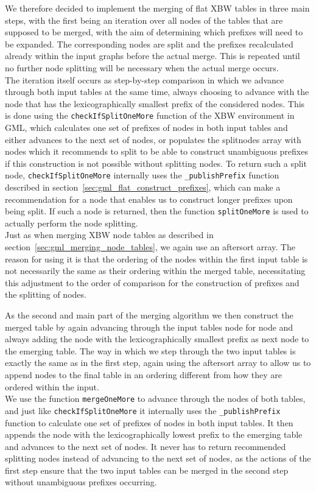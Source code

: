 \documentclass[a4paper,12pt,twoside,BCOR=10mm]{scrbook}
\begin{document}
We therefore decided to implement the merging of flat XBW tables in three main steps,
with the first being an iteration over all nodes of the tables that are supposed to be merged,
with the aim of determining which prefixes will need to be expanded. The corresponding nodes are
split and the prefixes recalculated already within the input graphs before the actual merge.
This is repeated until no further node splitting will be necessary when the actual
merge occurs. \\
The iteration itself occurs as step-by-step comparison in which we advance through
both input tables at the same time, always choosing to advance with the node that has the lexicographically
smallest prefix of the considered nodes.
This is done using the \texttt{checkIfSplitOneMore} function of the XBW environment in GML,
which calculates one set of prefixes of nodes in both input tables
and either advances to the next set of nodes, or populates the splitnodes array
with nodes which it recommends to split to be able to construct unambiguous prefixes if this
construction is not possible without splitting nodes.
To return such a split node, \texttt{checkIfSplitOneMore} internally uses the \texttt{\_publishPrefix} function
described in section~\ref{sec:gml_flat_construct_prefixes}, which can make a recommendation for a
node that enables us to construct longer prefixes upon being split.
If such a node is returned, then the function \texttt{splitOneMore} is used to actually
perform the node splitting. \\
Just as when merging XBW node tables as described in section~\ref{sec:gml_merging_node_tables},
we again use an aftersort array.
The reason for using it is that the ordering of the nodes within the first input table is not necessarily the
same as their ordering within the merged table, necessitating this adjustment to the order of comparison
for the construction of prefixes and the splitting of nodes.

As the second and main part of the merging algorithm
we then construct the merged table by again advancing through the
input tables node for node and always adding the node with the lexicographically smallest prefix
as next node to the emerging table. The way in which we step through the two input tables
is exactly the same as in the first step, again using the aftersort array to allow us to
append nodes to the final table in an ordering different from how they are
ordered within the input. \\
We use the function \texttt{mergeOneMore} to advance through the nodes of both tables,
and just like \texttt{checkIfSplitOneMore} it internally uses the \texttt{\_publishPrefix} function
to calculate one set of prefixes of nodes in both input tables.
It then appends the node with the lexicographically lowest prefix to the emerging table
and advances to the next set of nodes.
It never has to return recommended splitting nodes instead of advancing to the next
set of nodes, as the actions of the first step ensure that the two input tables
can be merged in the second step without unambiguous prefixes occurring.
\end{document}
